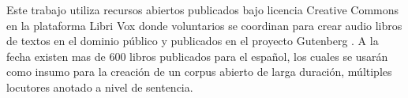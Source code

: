 \documentclass[a4paper,12pt,twoside]{report}
\begin{document}
Este trabajo utiliza recursos abiertos publicados bajo licencia Creative Commons en la plataforma Libri Vox \cite{LibriVox} donde voluntarios se coordinan para crear audio libros de textos en el dominio público y publicados en el proyecto Gutenberg \cite{gutenberg}. A la fecha existen mas de 600 libros publicados para el español, los cuales se usarán como insumo para la creación de un corpus abierto de larga duración, múltiples locutores anotado a nivel de sentencia.


% 
% 

\end{document}
